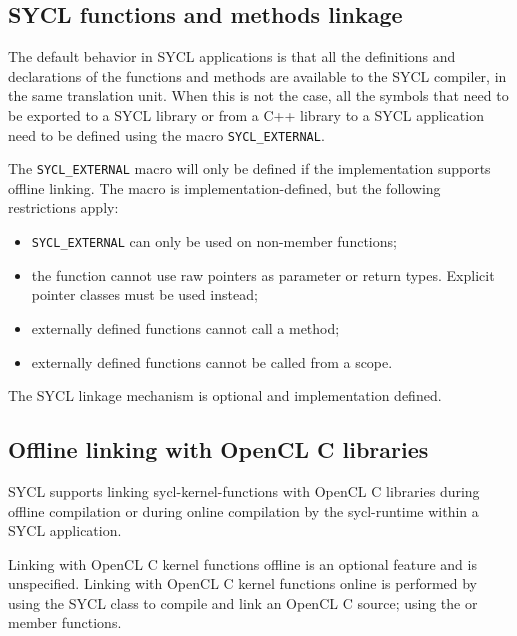 \subsection{SYCL functions and methods linkage}
\label{subsec:syclexternal}
The default behavior in SYCL applications is that all the definitions and
declarations of the functions and methods are available to the SYCL compiler,
in the same translation unit. When this is not the case, all the symbols that
need to be exported to a SYCL library or from a C++ library to a SYCL
application need to be defined using the macro \texttt{SYCL_EXTERNAL}.

The \texttt{SYCL_EXTERNAL} macro will only be defined if the implementation
supports offline linking. The macro is implementation-defined, but the following
restrictions apply:
\begin{itemize}
\item \texttt{SYCL_EXTERNAL} can only be used on non-member functions;
\item the function cannot use raw pointers as parameter or return types.
  Explicit pointer classes must be used instead;
\item externally defined functions cannot call a
   method;
\item externally defined functions cannot be called from a
   scope.
\end{itemize}

The SYCL linkage mechanism is optional and implementation defined.

\subsection{Offline linking with OpenCL C libraries}

SYCL supports linking \glspl{sycl-kernel-function} with OpenCL C libraries
during offline compilation or during online compilation by the
\gls{sycl-runtime} within a SYCL application.

Linking with OpenCL C kernel functions offline is an optional feature and is
unspecified. Linking with OpenCL C kernel functions online is performed by
using the SYCL  class to compile and link an OpenCL C source;
using the  or 
member functions.

